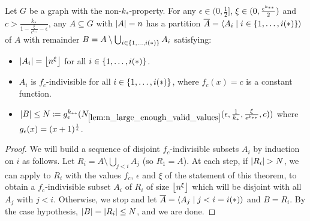         \begin{theorem} \label{thm:equitative_partition_high_regularity_parts_grow_with_n}
            Let $G$ be a graph with the non-$k_*$-property.
            For any $\epsilon \in (0, \frac{1}{2}]$, $\xi \in ( 0, \frac{\epsilon^{k_{**}}}{2} )$ and
            $c > \frac{k_*}{1-\frac{\xi}{\epsilon^{k_{**}}} - \epsilon}$, any $A \subseteq G$ with $| A | = n$
            has a partition $\overline{A} = \left< A_i \mid i \in \{ 1, \dots, i(*) \} \right>$ of $A$ with remainder
            $B = A \setminus \bigcup_{i \in \{ 1, \dots, i(*) \}} A_i$ satisfying:
            \begin{itemize}
                \item $|A_i| = \left\lfloor n^\xi \right\rfloor$ for all $i \in \{ 1, \dots, i(*) \}$.
                \item $A_i$ is $f_c$-indivisible for all $i \in \{ 1, \dots, i(*) \}$, where $f_c(x) = c$ is a constant function.
                \item $|B| \leq N \coloneqq g_\epsilon^{k_{**}}( N_{\ref{lem:n_large_enough_valid_values}}( \epsilon, \frac{1}{k_*}, \frac{\xi}{\epsilon^{k_{**}}}, c ) )$
                    where $g_\epsilon(x) = ( x+1 )^{\frac{1}{\epsilon}}$.
            \end{itemize}
            \begin{proof}
                We will build a sequence of disjoint $f_c$-indivisible subsets $A_i$ by induction on $i$ as follows.
                Let $R_i = A \setminus \bigcup_{j<i} A_j$ (so $R_1 = A$).
                At each step, if $| R_i | > N$, we can apply  to $R_i$
                with the values $f_c$, $\epsilon$ and $\xi$ of the statement of this theorem,
                to obtain a $f_c$-indivisible subset $A_i$ of $R_i$ of size $\left\lfloor n^\xi \right\rfloor$ which will be disjoint with
                all $A_j$ with $j < i$.
                Otherwise, we stop and let $\overline{A} = \left< A_j \mid j < i = i(*) \right>$ and $B = R_i$.
                By the case hypothesis, $| B | = | R_i | \leq N$, and we are done.
            \end{proof}
        \end{theorem}

